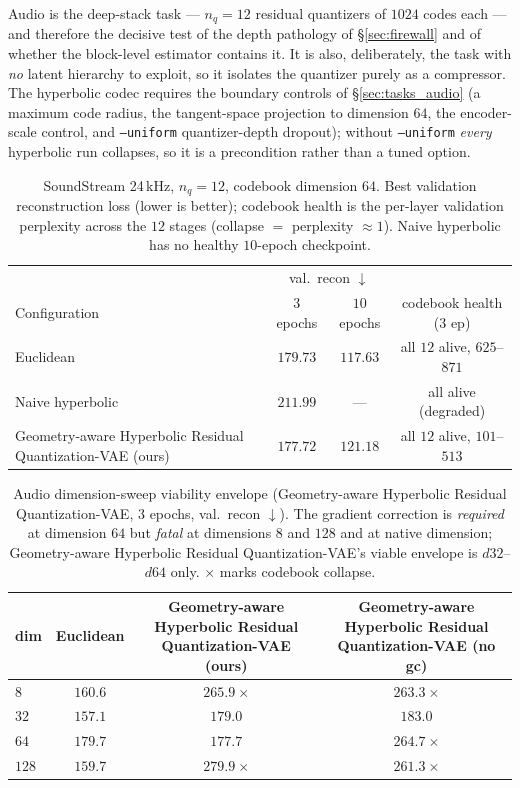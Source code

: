 \documentclass[12pt]{report}
\begin{document}
Audio is the deep-stack task --- $n_q=12$ residual quantizers of $1024$ codes each --- and therefore the decisive test of the depth pathology of \S\ref{sec:firewall} and of whether the block-level estimator contains it. It is also, deliberately, the task with \emph{no} latent hierarchy to exploit, so it isolates the quantizer purely as a compressor. The hyperbolic codec requires the boundary controls of \S\ref{sec:tasks_audio} (a maximum code radius, the tangent-space projection to dimension $64$, the encoder-scale control, and \texttt{--uniform} quantizer-depth dropout); without \texttt{--uniform} \emph{every} hyperbolic run collapses, so it is a precondition rather than a tuned option.

\begin{table}[h]
\centering
\caption{SoundStream 24\,kHz, $n_q=12$, codebook dimension $64$. Best validation reconstruction loss (lower is better); codebook health is the per-layer validation perplexity across the $12$ stages (collapse $=$ perplexity $\approx 1$). Naive hyperbolic has no healthy $10$-epoch checkpoint.}
\label{tab:audio_d64}
\begin{tabular}{lccc}
\hline
& \multicolumn{2}{c}{val.\ recon $\downarrow$} & \\
Configuration & $3$ epochs & $10$ epochs & codebook health ($3$ ep) \\
\hline
Euclidean & $179.73$ & $\mathbf{117.63}$ & all $12$ alive, $625$--$871$ \\
Naive hyperbolic & $211.99$ & --- & all alive (degraded) \\
Geometry-aware Hyperbolic Residual Quantization-VAE (ours) & $\mathbf{177.72}$ & $121.18$ & all $12$ alive, $101$--$513$ \\
\hline
\end{tabular}
\end{table}

\begin{table}[h]
\centering
\caption{Audio dimension-sweep viability envelope (Geometry-aware Hyperbolic Residual Quantization-VAE, $3$ epochs, val.\ recon $\downarrow$). The gradient correction is \emph{required} at dimension $64$ but \emph{fatal} at dimensions $8$ and $128$ and at native dimension; Geometry-aware Hyperbolic Residual Quantization-VAE's viable envelope is $d32$--$d64$ only. $\boldsymbol{\times}$ marks codebook collapse.}
\label{tab:audio_dim}
\begin{tabular}{lccc}
\hline
dim & Euclidean & Geometry-aware Hyperbolic Residual Quantization-VAE (ours) & Geometry-aware Hyperbolic Residual Quantization-VAE (no gc) \\
\hline
$8$   & $160.6$ & $265.9\ \boldsymbol{\times}$ & $263.3\ \boldsymbol{\times}$ \\
$32$  & $157.1$ & $179.0$ & $183.0$ \\
$64$  & $179.7$ & $\mathbf{177.7}$ & $264.7\ \boldsymbol{\times}$ \\
$128$ & $159.7$ & $279.9\ \boldsymbol{\times}$ & $261.3\ \boldsymbol{\times}$ \\
\hline
\end{tabular}
\end{table}
\end{document}
